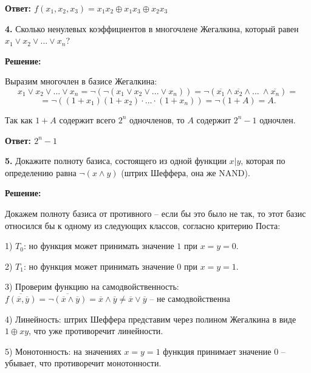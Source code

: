 \documentclass[a4paper,12pt]{article} %
\begin{document}
\begin{flushright}
\begin{large}
\textbf {Ответ: $f(x_1,x_2,x_3) = x_1x_2 \oplus x_1x_3 \oplus x_2x_3$}
\end{large}
\end{flushright}

{\bf 4.} Сколько ненулевых коэффициентов в многочлене Жегалкина, который равен $x_1 \vee x_2 \vee ... \vee x_n$?
\begin{center}
\bfseries
{\Large Решение: }
\end{center}

Выразим многочлен в базисе Жегалкина:
$$x_1 \vee x_2 \vee ... \vee x_n = \neg(\neg(x_1 \vee x_2 \vee ... \vee x_n)) = \neg(\overline{x_1}\wedge \overline{x_2} \wedge ...\ \wedge \overline{x_n}) =$$
$$= \neg((1 + x_1)(1 + x_2)\cdot ... \cdot (1 + x_n)) = \neg(1 + A) = A.$$

Так как $1 + A$ содержит всего $2^n$ одночленов, то $A$ содержит $2^n - 1$ одночлен.
\begin{flushright}
\begin{large}
\textbf {Ответ: $2^n - 1$}
\end{large}
\end{flushright}

{\bf 5.} Докажите полноту базиса, состоящего из одной функции $x | y$,
которая по определению равна $\neg(x \wedge y)$ (штрих Шеффера, она же
NAND).
\begin{center}
\bfseries
{\Large Решение: }
\end{center}

Докажем полноту базиса от противного -- если бы это было не так, то этот базис относился бы к одному из следующих классов, согласно критерию Поста:

1) $T_0$: но функция может принимать значение $1$ при $x = y = 0$.

2) $T_1$: но функция может принимать значение $0$ при $x = y = 1$.

3) Проверим функцию на самодвойственность: $\overline{f(\overline{x},\overline{y})} = \overline{\neg(\overline{x} \wedge \overline{y})} = \overline{x} \wedge \overline{y} \neq \overline{x} \vee \overline{y}$ -- не самодвойственна

4) Линейность: штрих Шеффера представим через полином Жегалкина в виде $1 \oplus xy$, что уже противоречит линейности.

5) Монотонность: на значениях $x = y = 1$ функция принимает значение $0$ -- убывает, что противоречит монотонности.
\end{document}
